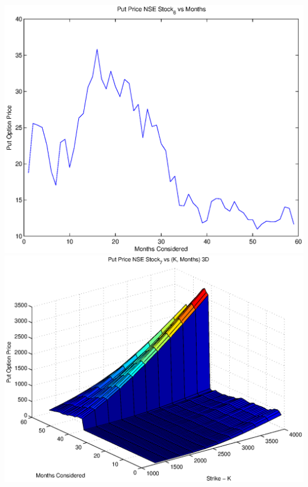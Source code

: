 \documentclass{article}
\begin{document}
\includegraphics[width=\textwidth]{Put_Price_NSE_Stock_6_vs_Months} \\

\includegraphics[width=\textwidth]{Put_Price_NSE_Stock_7_vs_(K,_Months)_3D} \\
\end{document}
